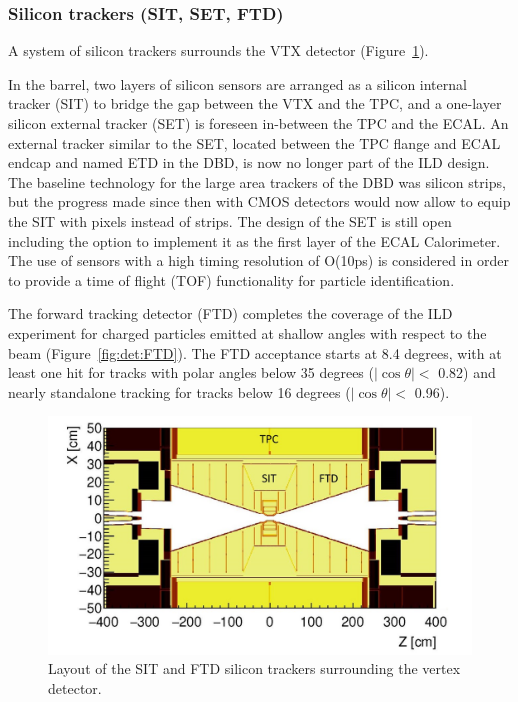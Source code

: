 \subsubsection*{Silicon trackers (SIT, SET, FTD)}

A system of silicon trackers surrounds the VTX detector (Figure~\ref{fig:det:silicon}). 

In the barrel, two layers of silicon sensors are arranged as a silicon internal tracker (SIT) to bridge the gap between the VTX and the TPC, and a one-layer silicon external tracker (SET) is foreseen in-between the TPC and the ECAL. An external tracker similar to the SET, located between the TPC flange and ECAL endcap and named ETD in the DBD, is now no longer part of the ILD design. The baseline technology for the large area trackers of the DBD was silicon strips, but the progress made since then with CMOS detectors would now allow to equip the SIT with pixels instead of strips. The design of the SET is still open including the option to implement it as the first layer of the ECAL Calorimeter. The use of sensors with a high timing resolution of O(10ps) is considered in order to provide a time of flight (TOF) functionality  for particle identification. 

The forward tracking detector (FTD) completes the coverage of the ILD experiment for charged particles emitted at shallow angles with respect to the beam (Figure~\ref{fig:det:FTD}). The FTD acceptance starts at 8.4 degrees, with at least one hit for tracks with polar angles below 35 degrees ($|\cos \theta| < $ 0.82) and nearly standalone tracking for tracks below 16 degrees ($|\cos \theta| <$ 0.96).

\begin{figure}[t!]
\centering
\includegraphics[width=0.75\hsize]{Detector/fig/silicon_trackers.jpg}
\caption{Layout of the SIT and FTD silicon trackers surrounding the vertex detector.}
\label{fig:det:silicon}
\end{figure}

